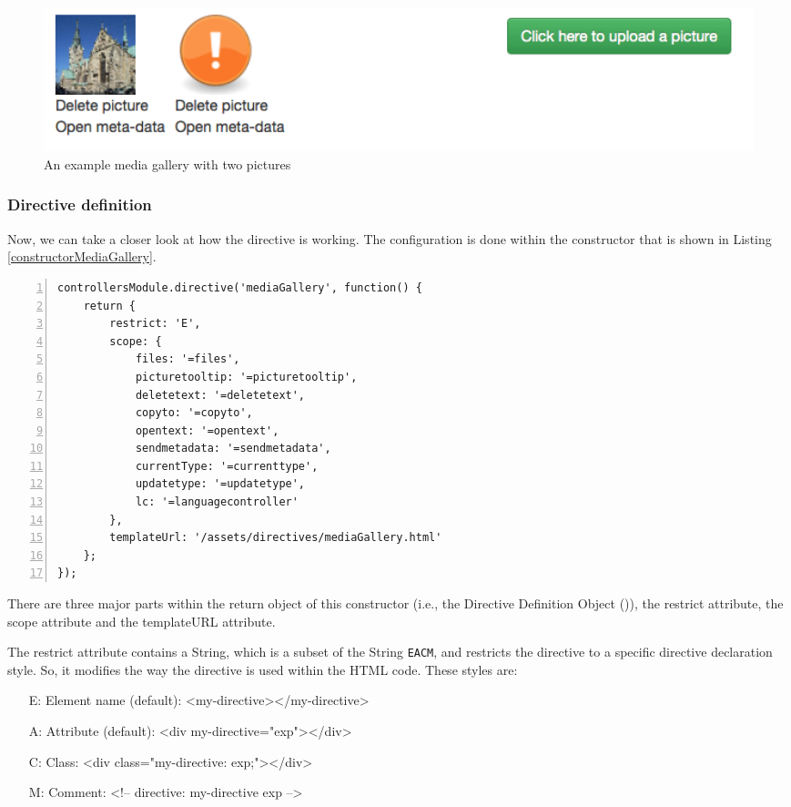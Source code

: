 \begin{figure}[th]
\centerline{\includegraphics[width=1\textwidth]{gfx/mediaGallery}}
\caption{An example media gallery with two pictures}
\label{mediaGallery}
\end{figure}

\subsubsection{Directive definition}
Now, we can take a closer look at how the directive is working. The configuration is done within the constructor that is shown in Listing \ref{constructorMediaGallery}.

\begin{lstlisting}[numbers=left,caption={The listing shows the initialisation of the media gallery directive.},label=constructorMediaGallery,frame=tlbr,breaklines]
controllersModule.directive('mediaGallery', function() {
    return {
        restrict: 'E',
        scope: {
            files: '=files',
            picturetooltip: '=picturetooltip',
            deletetext: '=deletetext',
            copyto: '=copyto',
            opentext: '=opentext',
            sendmetadata: '=sendmetadata',
            currentType: '=currenttype',
            updatetype: '=updatetype',
            lc: '=languagecontroller'
        },
        templateUrl: '/assets/directives/mediaGallery.html'
    };
});
\end{lstlisting}

There are three major parts within the return object of this constructor (i.e., the Directive Definition Object (\cite{AngularCons})), the restrict attribute, the scope attribute and the templateURL attribute. 

The restrict attribute contains a String, which is a subset of the String \verb|EACM|, and restricts the directive to a specific directive declaration style. So, it modifies the way the directive is used within the \ac{HTML} code. These styles are:

\begin{itemize}
\item[E:] Element name (default): <my-directive></my-directive>
\item[A:] Attribute (default): <div my-directive="exp"></div>
\item[C:] Class: <div class="my-directive: exp;"></div>
\item[M:] Comment: <!-- directive: my-directive exp -->
\end{itemize}

